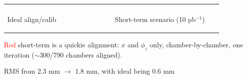 \documentclass[compress]{beamer}
\begin{document}
\begin{frame}
\begin{center}
\begin{tabular}{p{0.45\linewidth} p{0.45\linewidth}}
\begin{minipage}{\linewidth}
\end{minipage} \\
\begin{minipage}{\linewidth}
\begin{center}
Ideal align/calib
\end{center}
\end{minipage} &
\begin{minipage}{\linewidth}
\begin{center}
Short-term scenario (10 pb$^{-1}$)
\end{center}
\end{minipage}
\end{tabular}
\end{center}

\vfill \textcolor{red}{Red} short-term is a quickie alignment: $x$ and
$\phi_z$ only, chamber-by-chamber, one iteration ($\sim$300/790 chambers aligned).

\vfill RMS from 2.3 mm $\to$ 1.8 mm, with ideal being 0.6 mm
\end{frame}




\end{document}
